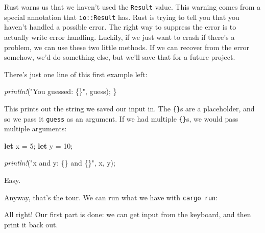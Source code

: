 \documentclass[a4paper,]{book}
\newenvironment{Shaded}{\begin{snugshade}}{\end{snugshade}}
\newcommand{\KeywordTok}[1]{\textcolor[rgb]{0.13,0.29,0.53}{\textbf{{#1}}}}
\newcommand{\DecValTok}[1]{\textcolor[rgb]{0.00,0.00,0.81}{{#1}}}
\newcommand{\StringTok}[1]{\textcolor[rgb]{0.31,0.60,0.02}{{#1}}}
\newcommand{\PreprocessorTok}[1]{\textcolor[rgb]{0.56,0.35,0.01}{\textit{{#1}}}}
\newcommand{\NormalTok}[1]{{#1}}
\begin{document}
Rust warns us that we haven't used the \texttt{Result} value. This
warning comes from a special annotation that \texttt{io::Result} has.
Rust is trying to tell you that you haven't handled a possible error.
The right way to suppress the error is to actually write error handling.
Luckily, if we just want to crash if there's a problem, we can use these
two little methods. If we can recover from the error somehow, we'd do
something else, but we'll save that for a future project.

There's just one line of this first example left:

\begin{Shaded}
\begin{Highlighting}[]
    \PreprocessorTok{println!}\NormalTok{(}\StringTok{"You guessed: \{\}"}\NormalTok{, guess);}
\NormalTok{\}}
\end{Highlighting}
\end{Shaded}

This prints out the string we saved our input in. The \texttt{\{\}}s are
a placeholder, and so we pass it \texttt{guess} as an argument. If we
had multiple \texttt{\{\}}s, we would pass multiple arguments:

\begin{Shaded}
\begin{Highlighting}[]
\KeywordTok{let} \NormalTok{x = }\DecValTok{5}\NormalTok{;}
\KeywordTok{let} \NormalTok{y = }\DecValTok{10}\NormalTok{;}

\PreprocessorTok{println!}\NormalTok{(}\StringTok{"x and y: \{\} and \{\}"}\NormalTok{, x, y);}
\end{Highlighting}
\end{Shaded}

Easy.

Anyway, that's the tour. We can run what we have with
\texttt{cargo\ run}:

\begin{Shaded}
\end{Shaded}

All right! Our first part is done: we can get input from the keyboard,
and then print it back out.
\end{document}
